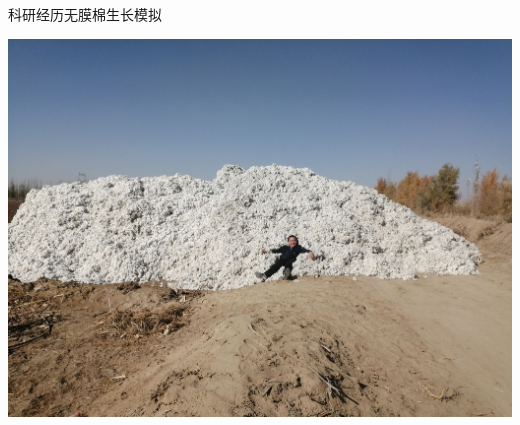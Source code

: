 \documentclass[xcolor=svgnames, t, aspectratio=169]{ctexbeamer}
\begin{document}
\begin{frame}{科研经历}{无膜棉生长模拟}
  \begin{center}
    \includegraphics[scale=0.16, trim=0 100 0 0, clip]{yield.jpg}
  \end{center}
\end{frame}
\end{document}

